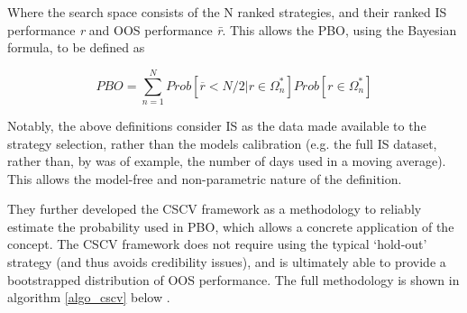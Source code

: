 \documentclass[a4paper,11pt,oneside]{article}
\theoremstyle{plain}
\theoremstyle{definition}
\begin{document}
Where the search space {\textOmega} consists of the N ranked strategies, and their ranked IS performance \textit{r} and OOS performance
\textit{\={r}}. This allows the PBO, using the Bayesian formula, to be defined as 

\begin{equation}\label{eq:PBO2}
PBO = \sum_{n=1}^{N}Prob[\overline{r} < {N/2}|r\in\Omega_{n}^{*}]Prob[r\in\Omega_{n}^{*}]
\end{equation}

Notably, the above definitions consider IS as the data made available to the strategy selection, rather than the 
models calibration (e.g. the full IS dataset, rather than, by was of example, the number of days used in a moving average). 
This allows the model-free and non-parametric nature of the definition. 
\hfill \break 

They further developed the CSCV framework as a methodology to reliably estimate the probability used in PBO, which allows a concrete application of the concept. The CSCV framework does not require using the typical ‘hold-out’ strategy (and thus avoids credibility issues), and is ultimately able to provide a bootstrapped distribution of OOS performance. The full methodology is shown in algorithm \ref{algo_cscv} below \cite{BailyPBO}.
\hfill \break 
\end{document}
